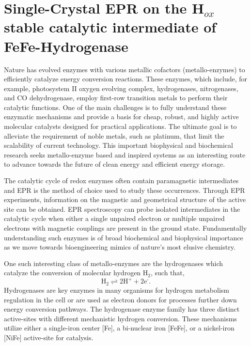 \chapter[Single-Crystal EPR on FeFe-Hydrogenase]{Single-Crystal EPR on the H$_{ox}$ stable catalytic intermediate of FeFe-Hydrogenase}

Nature has evolved enzymes with various metallic cofactors (metallo-enzymes) to efficiently catalyze energy conversion reactions. These enzymes, which include, for example, photosystem II oxygen evolving complex\cite{CoxOEC}, hydrogenases\cite{lubitzhyd}, nitrogenases\cite{Hoffman2014rev}, and CO dehydrogenase\cite{C5CS00182J}, employ first-row transition metals to perform their catalytic functions. One of the main challenges is to fully understand these enzymatic mechanisms and provide a basis for cheap, robust, and highly active molecular catalysts designed for practical applications. \cite{Lewis15729} The ultimate goal is to alleviate the requirement of noble metals, such as platinum, that limit the scalability of current technology. This important biophysical and biochemical research seeks metallo-enzyme based and inspired systems as an interesting route to advance towards the future of clean energy and efficient energy storage. \cite{schlogl2012chemical}

The catalytic cycle of redox enzymes often contain paramagnetic intermediates and EPR is the method of choice used to study these occurrences. Through EPR experiments, information on the magnetic and geometrical structure of the active site can be obtained. EPR spectroscopy can probe isolated intermediates in the catalytic cycle when either a single unpaired electron or multiple unpaired electrons with magnetic couplings are present in the ground state. Fundamentally understanding such enzymes is of broad biochemical and biophysical importance as we move towards bioengineering mimics of nature’s most elusive chemistry. \cite{WATANABE20171}

One such interesting class of metallo-enzymes are the hydrogenases\cite{lubitzhyd} which catalyze the conversion of molecular hydrogen H$_2$, such that,
\begin{equation}
    \text{H}_2 \rightleftharpoons 2 \text{H}^+ + 2\text{e}^{\text{-}}.
\end{equation}
Hydrogenases are key enzymes in many organisms for hydrogen metabolism regulation in the cell or are used as electron donors for processes further down energy conversion pathways. The hydrogenase enzyme family has three distinct active-sites with different mechanistic hydrogen conversion. These mechanisms utilize either a single-iron center [Fe], a bi-nuclear iron [FeFe], or a nickel-iron [NiFe] active-site for catalysis.

